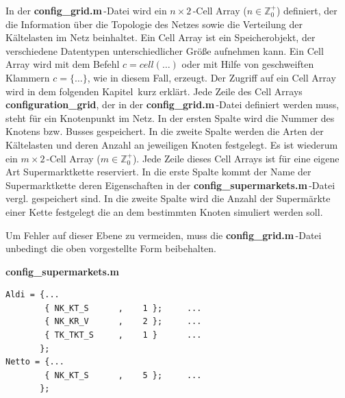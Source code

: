 In der \textbf{config\_grid.m}$\,$-Datei wird  ein $n\times2\,$-Cell Array
($n\in \mathbb{Z}^+_0$) definiert, der die Information über die Topologie des
Netzes sowie die Verteilung der Kältelasten im Netz beinhaltet. Ein Cell Array
ist ein Speicherobjekt, der verschiedene Datentypen unterschiedlicher Größe
aufnehmen kann\cite[Teil 2, Seite 15]{MATLAB-Buch}.  Ein Cell Array wird mit dem
Befehl $c=cell(\ldots)$ oder mit Hilfe von geschweiften Klammern $c=\{\ldots\}$,
wie in diesem Fall, erzeugt. Der Zugriff auf ein Cell Array wird in dem
folgenden Kapitel$\,$ kurz
erklärt. Jede Zeile des Cell Arrays
\textbf{configuration\_grid}, der in der \textbf{config\_grid.m}$\,$-Datei
definiert werden muss, steht für ein Knotenpunkt im Netz. In der ersten Spalte
wird die Nummer des Knotens bzw. Busses gespeichert. In die zweite Spalte werden
die Arten der Kältelasten und deren Anzahl an jeweiligen Knoten festgelegt. Es
ist wiederum ein $m\times2\,$-Cell Array ($m\in \mathbb{Z}^+_0$). Jede Zeile
dieses Cell Arrays ist für eine eigene Art Supermarktkette reserviert. In die
erste Spalte kommt der Name der Supermarktkette deren Eigenschaften in der
\textbf{config\_supermarkets.m$\,$}-Datei vergl.   gespeichert
sind. In die zweite Spalte wird die Anzahl der Supermärkte einer Kette
festgelegt die an dem bestimmten Knoten simuliert werden soll.

Um Fehler auf dieser Ebene zu vermeiden, muss die
\textbf{config\_grid.m}$\,$-Datei unbedingt die oben vorgestellte Form
beibehalten.

\vspace{3mm}
\noindent\textbf{config\_supermarkets.m}
\vspace{3mm}


\begin{lstlisting}[float=h!,caption=config\_supermarkets.m,label={csuper}]
%%       Kind of fridge     Anzahl
Aldi = {...
        { NK_KT_S      ,    1 };     ...
        { NK_KR_V      ,    2 };     ...
        { TK_TKT_S     ,    1 }      ...
       };
Netto = {...
        { NK_KT_S      ,    5 };     ...
       };
\end{lstlisting}

